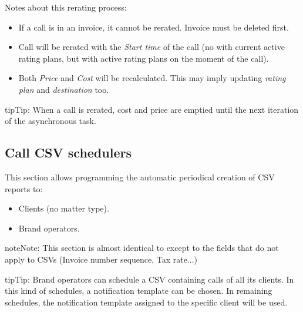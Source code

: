 \documentclass[letterpaper,10pt,english]{sphinxmanual}
\begin{document}
Notes about this rerating process:
\begin{itemize}
\item {} 
If a call is in an invoice, it cannot be rerated. Invoice must be deleted first.

\item {} 
Call will be rerated with the \emph{Start time} of the call (no with current active rating plans, but with active rating plans
on the moment of the call).

\item {} 
Both \emph{Price} and \emph{Cost} will be recalculated. This may imply updating \emph{rating plan} and \emph{destination} too.

\end{itemize}

\begin{notice}{tip}{Tip:}
When a call is rerated, cost and price are emptied until the next iteration of the asynchronous task.
\end{notice}


\subsection{Call CSV schedulers}
\label{administration_portal/brand/calls/call_csv_schedulers:call-csv-schedulers}\label{administration_portal/brand/calls/call_csv_schedulers::doc}
This section allows programming the automatic periodical creation of CSV reports to:
\begin{itemize}
\item {} 
Clients (no matter type).

\item {} 
Brand operators.

\end{itemize}

\begin{notice}{note}{Note:}
This section is almost identical to {\hyperref[administration_portal/brand/invoicing/invoice_schedulers:invoice\string-schedulers]{}} except to the
fields that do not apply to CSVs (Invoice number sequence, Tax rate...)
\end{notice}

\begin{notice}{tip}{Tip:}
Brand operators can schedule a CSV containing calls of all its clients.
In this kind of schedules, a notification template can be chosen. In remaining
schedules, the notification template assigned to the specific client will be used.
\end{notice}
\end{document}

